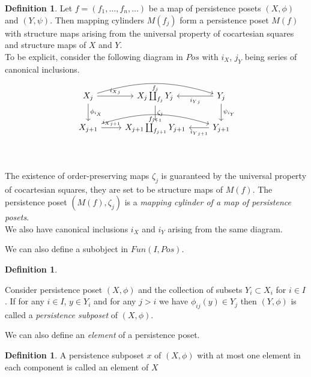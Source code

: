 \documentclass[english,12pt]{article}
\newcounter{stmcounter}[section]
\numberwithin{equation}{section}
\theoremstyle{definition}
\newtheorem{definition}[stmcounter]{Definition}
\theoremstyle{remark}
\newcommand{\define}[1]{{\textit{#1}}}
\begin{document}
\begin{definition}
  Let $f = (f_1,\ldots,f_n,\ldots)$ be a map of persistence posets $(X, \phi)$ and $(Y, \psi)$. Then mapping cylinders $M(f_j)$ form a persistence poset $M(f)$ with structure maps arising from the universal property of cocartesian squares and structure maps of $X$ and $Y$.\\

  To be explicit, consider the following diagram in $Pos$ with $i_X$, $j_Y$ being series of canonical inclusions.\\
  \begin{equation}
  \begin{tikzcd}
  X_{j}\arrow{r}{{i_X}_j}\arrow{d}{\phi_{i_X}}\arrow[bend left=17,swap]{rr}{f_j} & X_j \coprod_{f_j} Y_j\arrow{d}{\zeta_j} & Y_{j}\arrow{l}{{i_Y}_j}\arrow{d}{\psi_{i_Y}} \\
  X_{j+1}\arrow{r}{{i_X}_{j+1}}\arrow[bend left=17,swap]{rr}{f_{j+1}} & X_{j+1} \coprod_{f_{j+1}} Y_{j+1} & Y_{j+1}\arrow{l}{{i_Y}_{j+1}} \\
  \end{tikzcd}
  \end{equation}\\

  The existence of order-preserving maps $\zeta_j$ is guaranteed by the universal property of cocartesian squares, they are set to be structure maps of $M(f)$. The persistence poset $(M(f), \zeta_j)$ is a \define{mapping cylinder of a map of persistence posets}.\\

  We also have canonical inclusions $i_X$ and $i_Y$ arising from the same diagram.
\end{definition}

We can also define a subobject in $Fun(I, Pos)$.

\begin{definition} ~ \par
  Consider persistence poset $(X,\phi)$ and the collection of subsets $Y_i \subset X_i$ for $i \in I$.
  If for any $i \in I$, $y \in Y_i$ and for any $j>i$ we have $\phi_{ij}(y) \in Y_j$ then $(Y,\phi)$ is called a \define{persistence subposet} of $(X,\phi)$.
\end{definition}

We can also define an \define{element} of a persistence poset.
\begin{definition}
  A persistence subposet $x$ of $(X,\phi)$ with at most one element in each component is called an element of $X$
\end{definition}
\end{document}
